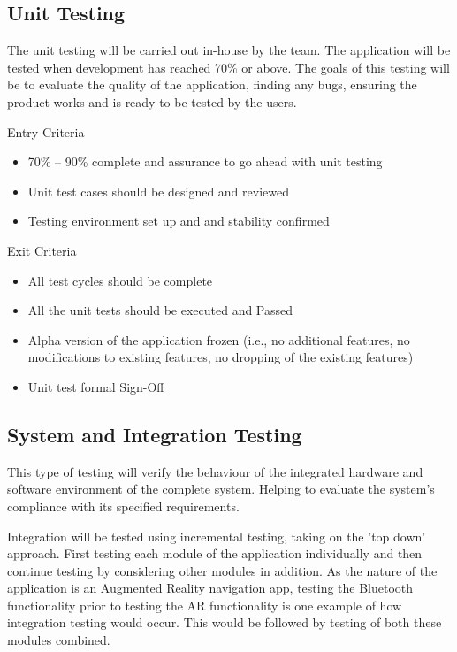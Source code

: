 \subsection*{Unit Testing}
The unit testing will be carried out in-house by the team. The application will be tested when development has reached 70\% or above. The goals of this testing will be to evaluate the quality of the application, finding any bugs, ensuring the product works and is ready to be tested by the users.


Entry Criteria

\begin{itemize}
    \item 70\% – 90\% complete and assurance to go ahead with unit testing
    \item Unit test cases should be designed and reviewed
    \item Testing environment set up and and stability confirmed
\end{itemize}

Exit Criteria

\begin{itemize}
    \item All test cycles should be complete
    \item All the unit tests should be executed and Passed
    \item Alpha version of the application frozen (i.e., no additional features, no modifications to existing features, no dropping of the existing features)
    \item Unit test formal Sign-Off
\end{itemize}

\subsection*{System and Integration Testing}
This type of testing will verify the behaviour of the integrated hardware and software environment of the complete system. Helping to evaluate the system's compliance with its specified requirements.

Integration will be tested using incremental testing, taking on the 'top down' approach. First testing each module of the application individually and then continue testing by considering other modules in addition. As the nature of the application is an Augmented Reality navigation app, testing the Bluetooth functionality prior to testing the AR functionality is one example of how integration testing would occur. This would be followed by testing of both these modules combined.

